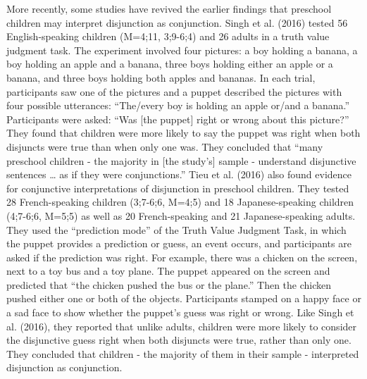 \documentclass[floatsintext,man]{apa6}
\theoremstyle{definition}
\theoremstyle{definition}
\theoremstyle{definition}
\theoremstyle{remark}
\begin{document}
More recently, some studies have revived the earlier findings that
preschool children may interpret disjunction as conjunction. Singh et
al. (2016) tested 56 English-speaking children (M=4;11, 3;9-6;4) and 26
adults in a truth value judgment task. The experiment involved four
pictures: a boy holding a banana, a boy holding an apple and a banana,
three boys holding either an apple or a banana, and three boys holding
both apples and bananas. In each trial, participants saw one of the
pictures and a puppet described the pictures with four possible
utterances: \enquote{The/every boy is holding an apple or/and a banana.}
Participants were asked: \enquote{Was {[}the puppet{]} right or wrong
about this picture?} They found that children were more likely to say
the puppet was right when both disjuncts were true than when only one
was. They concluded that \enquote{many preschool children - the majority
in {[}the study's{]} sample - understand disjunctive sentences \ldots{}
as if they were conjunctions.} Tieu et al. (2016) also found evidence
for conjunctive interpretations of disjunction in preschool children.
They tested 28 French-speaking children (3;7-6;6, M=4;5) and 18
Japanese-speaking children (4;7-6;6, M=5;5) as well as 20
French-speaking and 21 Japanese-speaking adults. They used the
\enquote{prediction mode} of the Truth Value Judgment Task, in which the
puppet provides a prediction or guess, an event occurs, and participants
are asked if the prediction was right. For example, there was a chicken
on the screen, next to a toy bus and a toy plane. The puppet appeared on
the screen and predicted that \enquote{the chicken pushed the bus or the
plane.} Then the chicken pushed either one or both of the objects.
Participants stamped on a happy face or a sad face to show whether the
puppet's guess was right or wrong. Like Singh et al. (2016), they
reported that unlike adults, children were more likely to consider the
disjunctive guess right when both disjuncts were true, rather than only
one. They concluded that children - the majority of them in their sample
- interpreted disjunction as conjunction.
\end{document}
